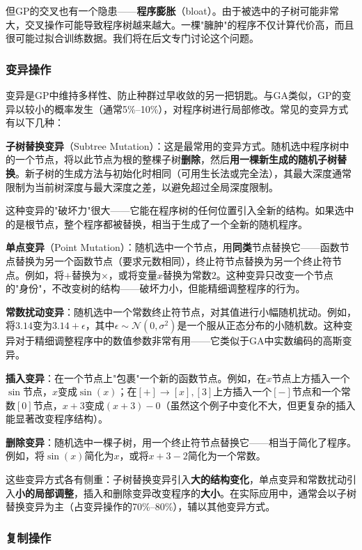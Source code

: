 \documentclass[lang=cn,zihao=-4,a4paper,fontset=windows]{beautybook}
\begin{document}
但GP的交叉也有一个隐患——\textbf{程序膨胀}（bloat）。由于被选中的子树可能非常大，交叉操作可能导致程序树越来越大。一棵"臃肿"的程序不仅计算代价高，而且很可能过拟合训练数据。我们将在后文专门讨论这个问题。

\subsubsection{变异操作}

变异是GP中维持多样性、防止种群过早收敛的另一把钥匙。与GA类似，GP的变异以较小的概率发生（通常5\%--10\%），对程序树进行局部修改。常见的变异方式有以下几种：

\textbf{子树替换变异}（Subtree Mutation）：这是最常用的变异方式。随机选中程序树中的一个节点，将以此节点为根的整棵子树\textbf{删除}，然后\textbf{用一棵新生成的随机子树替换}。新子树的生成方法与初始化时相同（可用生长法或完全法），其最大深度通常限制为当前树深度与最大深度之差，以避免超过全局深度限制。

这种变异的"破坏力"很大——它能在程序树的任何位置引入全新的结构。如果选中的是根节点，整个程序都被替换，相当于生成了一个全新的随机程序。

\textbf{单点变异}（Point Mutation）：随机选中一个节点，用\textbf{同类}节点替换它——函数节点替换为另一个函数节点（要求元数相同），终止符节点替换为另一个终止符节点。例如，将$+$替换为$\times$，或将变量$x$替换为常数$2$。这种变异只改变一个节点的"身份"，不改变树的结构——破坏力小，但能精细调整程序的行为。

\textbf{常数扰动变异}：随机选中一个常数终止符节点，对其值进行小幅随机扰动。例如，将$3.14$变为$3.14 + \epsilon$，其中$\epsilon \sim \mathcal{N}(0, \sigma^2)$是一个服从正态分布的小随机数。这种变异对于精细调整程序中的数值参数非常有用——它类似于GA中实数编码的高斯变异。

\textbf{插入变异}：在一个节点上"包裹"一个新的函数节点。例如，在$x$节点上方插入一个$\sin$节点，$x$变成$\sin(x)$；在$[+] \to [x], [3]$上方插入一个$[-]$节点和一个常数$[0]$节点，$x+3$变成$(x+3) - 0$（虽然这个例子中变化不大，但更复杂的插入能显著改变程序结构）。

\textbf{删除变异}：随机选中一棵子树，用一个终止符节点替换它——相当于简化了程序。例如，将$\sin(x)$简化为$x$，或将$x + 3 - 2$简化为一个常数。

这些变异方式各有侧重：子树替换变异引入\textbf{大的结构变化}，单点变异和常数扰动引入\textbf{小的局部调整}，插入和删除变异改变程序的\textbf{大小}。在实际应用中，通常会以子树替换变异为主（占变异操作的70\%--80\%），辅以其他变异方式。

\subsubsection{复制操作}
\end{document}
